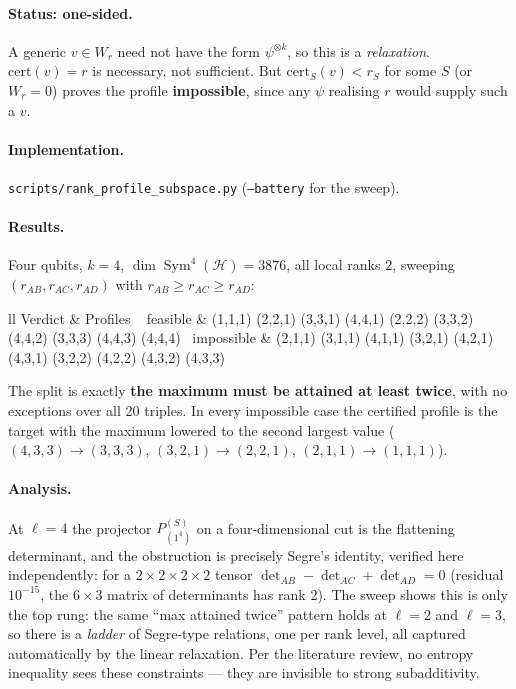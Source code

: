 \documentclass[11pt]{article}
\theoremstyle{definition}
\theoremstyle{remark}
\newcommand{\Sym}{\operatorname{Sym}}
\newcommand{\Hil}{\mathcal{H}}
\begin{document}
\paragraph{Status: one-sided.} A generic $v \in W_r$ need not have the form
$\psi^{\otimes k}$, so this is a \emph{relaxation}. $\mathrm{cert}(v) = r$ is necessary,
not sufficient. But $\mathrm{cert}_S(v) < r_S$ for some $S$ (or $W_r = 0$) proves the
profile \textbf{impossible}, since any $\psi$ realising $r$ would supply such a $v$.

\paragraph{Implementation.} \texttt{scripts/rank\_profile\_subspace.py}
(\texttt{--battery} for the sweep).

\paragraph{Results.}
Four qubits, $k = 4$, $\dim\Sym^4(\Hil) = 3876$, all local ranks $2$, sweeping
$(r_{AB},r_{AC},r_{AD})$ with $r_{AB}\ge r_{AC} \ge r_{AD}$:

{
\setlength{\tabcolsep}{8pt}
\renewcommand{\arraystretch}{1.2}
\begin{tabular}{ll}
\toprule
Verdict & Profiles \
\midrule
feasible    & (1,1,1) (2,2,1) (3,3,1) (4,4,1) (2,2,2) (3,3,2) (4,4,2) (3,3,3) (4,4,3) (4,4,4) \
impossible  & (2,1,1) (3,1,1) (4,1,1) (3,2,1) (4,2,1) (4,3,1) (3,2,2) (4,2,2) (4,3,2) (4,3,3) \
\bottomrule
\end{tabular}
}

\medskip
\noindent The split is exactly \textbf{the maximum must be attained at least twice},
with no exceptions over all 20 triples. In every impossible case the certified profile
is the target with the maximum lowered to the second largest value
($(4,3,3) \to (3,3,3)$, $(3,2,1) \to (2,2,1)$, $(2,1,1)\to(1,1,1)$).

\paragraph{Analysis.}
At $\ell = 4$ the projector $P^{(S)}_{(1^4)}$ on a four-dimensional cut is the flattening
determinant, and the obstruction is precisely Segre's identity, verified here
independently: for a $2\times2\times2\times2$ tensor
$\det_{AB} - \det_{AC} + \det_{AD} = 0$ (residual $10^{-15}$, the $6\times3$ matrix of
determinants has rank 2). The sweep shows this is only the top rung: the same
``max attained twice'' pattern holds at $\ell = 2$ and $\ell = 3$, so there is a
\emph{ladder} of Segre-type relations, one per rank level, all captured automatically by
the linear relaxation. Per the literature review, no entropy inequality sees these
constraints --- they are invisible to strong subadditivity.
\end{document}
